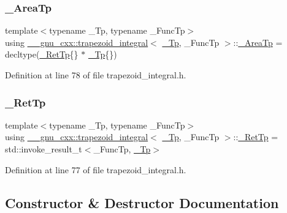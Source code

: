 \subsubsection{\texorpdfstring{\+\_\+\+Area\+Tp}{\_AreaTp}}
{\footnotesize\ttfamily template$<$typename \+\_\+\+Tp, typename \+\_\+\+Func\+Tp$>$ \\
using \hyperlink{class____gnu__cxx_1_1trapezoid__integral}{\+\_\+\+\_\+gnu\+\_\+cxx\+::trapezoid\+\_\+integral}$<$ \hyperlink{namespace____gnu__cxx_a3b19a9c800ca194374ef9172290f7d79}{\+\_\+\+Tp}, \+\_\+\+Func\+Tp $>$\+::\hyperlink{class____gnu__cxx_1_1trapezoid__integral_a41c7c672204caf0e1b842c3664aca85f}{\+\_\+\+Area\+Tp} =  decltype(\hyperlink{class____gnu__cxx_1_1trapezoid__integral_a0418b1ec467b97907150ed7ae82fe3bc}{\+\_\+\+Ret\+Tp}\{\} $\ast$ \hyperlink{namespace____gnu__cxx_a3b19a9c800ca194374ef9172290f7d79}{\+\_\+\+Tp}\{\})}



Definition at line 78 of file trapezoid\+\_\+integral.\+h.

\mbox{\label{class____gnu__cxx_1_1trapezoid__integral_a0418b1ec467b97907150ed7ae82fe3bc}} 
\subsubsection{\texorpdfstring{\+\_\+\+Ret\+Tp}{\_RetTp}}
{\footnotesize\ttfamily template$<$typename \+\_\+\+Tp, typename \+\_\+\+Func\+Tp$>$ \\
using \hyperlink{class____gnu__cxx_1_1trapezoid__integral}{\+\_\+\+\_\+gnu\+\_\+cxx\+::trapezoid\+\_\+integral}$<$ \hyperlink{namespace____gnu__cxx_a3b19a9c800ca194374ef9172290f7d79}{\+\_\+\+Tp}, \+\_\+\+Func\+Tp $>$\+::\hyperlink{class____gnu__cxx_1_1trapezoid__integral_a0418b1ec467b97907150ed7ae82fe3bc}{\+\_\+\+Ret\+Tp} =  std\+::invoke\+\_\+result\+\_\+t$<$\+\_\+\+Func\+Tp, \hyperlink{namespace____gnu__cxx_a3b19a9c800ca194374ef9172290f7d79}{\+\_\+\+Tp}$>$}



Definition at line 77 of file trapezoid\+\_\+integral.\+h.



\subsection{Constructor \& Destructor Documentation}
\mbox{\label{class____gnu__cxx_1_1trapezoid__integral_a90fde7766cc7a14221a8b98480d5ae7c}} 
